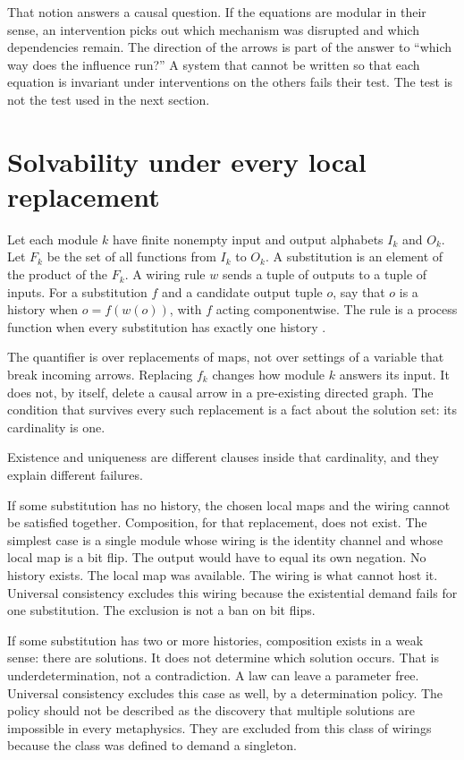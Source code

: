 \documentclass[11pt]{article}
\begin{document}
That notion answers a causal question. If the equations are modular in their sense, an intervention picks out which mechanism was disrupted and which dependencies remain. The direction of the arrows is part of the answer to ``which way does the influence run?'' A system that cannot be written so that each equation is invariant under interventions on the others fails their test. The test is not the test used in the next section.

\section{Solvability under every local replacement}
\label{sec:sol}

Let each module \(k\) have finite nonempty input and output alphabets \(I_k\) and \(O_k\). Let \(F_k\) be the set of all functions from \(I_k\) to \(O_k\). A substitution is an element of the product of the \(F_k\). A wiring rule \(w\) sends a tuple of outputs to a tuple of inputs. For a substitution \(f\) and a candidate output tuple \(o\), say that \(o\) is a history when \(o=f(w(o))\), with \(f\) acting componentwise. The rule is a process function when every substitution has exactly one history \citep{baumeler2016}.

The quantifier is over replacements of maps, not over settings of a variable that break incoming arrows. Replacing \(f_k\) changes how module \(k\) answers its input. It does not, by itself, delete a causal arrow in a pre-existing directed graph. The condition that survives every such replacement is a fact about the solution set: its cardinality is one.

Existence and uniqueness are different clauses inside that cardinality, and they explain different failures.

If some substitution has no history, the chosen local maps and the wiring cannot be satisfied together. Composition, for that replacement, does not exist. The simplest case is a single module whose wiring is the identity channel and whose local map is a bit flip. The output would have to equal its own negation. No history exists. The local map was available. The wiring is what cannot host it. Universal consistency excludes this wiring because the existential demand fails for one substitution. The exclusion is not a ban on bit flips.

If some substitution has two or more histories, composition exists in a weak sense: there are solutions. It does not determine which solution occurs. That is underdetermination, not a contradiction. A law can leave a parameter free. Universal consistency excludes this case as well, by a determination policy. The policy should not be described as the discovery that multiple solutions are impossible in every metaphysics. They are excluded from this class of wirings because the class was defined to demand a singleton.
\end{document}
